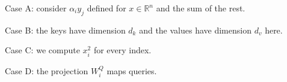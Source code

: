 \documentclass{article}
\begin{document}
Case A: consider $\alpha_i y_j$ defined for $x \in \mathbb{R}^n$ and the sum of the rest.

Case B: the keys have dimension $d_k$ and the values have dimension $d_v$ here.

Case C: we compute $x_i^2$ for every index.

Case D: the projection $W_i^Q$ maps queries.
\end{document}
